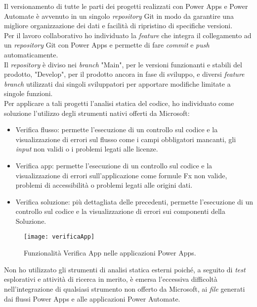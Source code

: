 Il versionamento di tutte le parti dei progetti realizzati con Power Apps e Power Automate è avvenuto in un singolo \emph{repository} Git in modo da garantire una migliore organizzazione dei dati e facilità di ripristino di specifiche versioni.\\
Per il lavoro collaborativo ho individuato la \emph{feature} che integra il collegamento ad un \emph{repository} Git con Power Apps e permette di fare \emph{commit} e \emph{push} automaticamente.\\
Il \emph{repository} è diviso nei \emph{branch} "Main", per le versioni funzionanti e stabili del prodotto, "Develop", per il prodotto ancora in fase di sviluppo, e diversi \emph{feature branch} utilizzati dai singoli sviluppatori per apportare modifiche limitate a singole funzioni.\\
Per applicare a tali progetti l'analisi statica del codice, ho individuato come soluzione l'utilizzo degli strumenti nativi offerti da Microsoft:
\begin{itemize}
    \item Verifica flusso: permette l'esecuzione di un controllo sul codice e la visualizzazione di errori sul flusso come i campi obbligatori mancanti, gli \emph{input} non validi o i problemi legati alle licenze. 
    \item Verifica app: permette l'esecuzione di un controllo sul codice e la visualizzazione di errori sull'applicazione come formule Fx non valide, problemi di accessibilità o problemi legati alle origini dati. 
    \item Verifica soluzione: più dettagliata delle precedenti, permette l'esecuzione di un controllo sul codice e la visualizzazione di errori sui componenti della Soluzione.
\end{itemize}
\begin{figure}[htbp] 
    \centering 
    \texttt{[image: verificaApp]} 
    \caption{Funzionalità Verifica App nelle applicazioni Power Apps.}
    \label{fig:verificaApp}
\end{figure}

\noindent Non ho utilizzato gli strumenti di analisi statica esterni poiché, a seguito di \emph{test} esplorativi e attività di ricerca in merito, è emersa l'eccessiva difficoltà nell'integrazione di qualsiasi strumento non offerto da Microsoft, ai \emph{file} generati dai flussi Power Apps e alle applicazioni Power Automate. 

